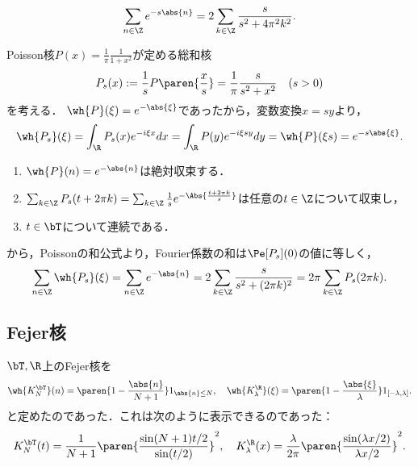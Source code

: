 \documentclass[uplatex,dvipdfmx]{jsreport}
\begin{document}
\begin{corollary}[$\R$上のPoisson核に関するPoissonの和公式]
    \[\sum_{n\in\Z}e^{-s\abs{n}}=2\sum_{k\in\Z}\frac{s}{s^2+4\pi^2k^2}.\]
\end{corollary}
\begin{Proof}
    Poisson核$P(x)=\frac{1}{\pi}\frac{1}{1+x^2}$が定める総和核
    \[P_s(x):=\frac{1}{s}P\paren{\frac{x}{s}}=\frac{1}{\pi}\frac{s}{s^2+x^2}\quad(s>0)\]
    を考える．
    $\wh{P}(\xi)=e^{-\abs{\xi}}$であったから，変数変換$x=sy$より，
    \[\wh{P_s}(\xi)=\int_\R P_s(x)e^{-i\xi x}dx=\int_\R P(y)e^{-i\xi sy}dy=\wh{P}(\xi s)=e^{-s\abs{\xi}}.\]
    \begin{enumerate}
        \item $\wh{P}(n)=e^{-\abs{n}}$は絶対収束する．
        \item $\sum_{k\in\Z}P_s(t+2\pi k)=\sum_{k\in\Z}\frac{1}{s}e^{-\Abs{\frac{t+2\pi k}{s}}}$は任意の$t\in\Z$について収束し，
        \item $t\in\bT$について連続である．
    \end{enumerate}
    から，Poissonの和公式より，Fourier係数の和は$\Pe[P_s](0)$の値に等しく，
    \[\sum_{n\in\Z}\wh{P_s}(\xi)=\sum_{n\in\Z}e^{-\abs{n}}=2\sum_{k\in\Z}\frac{s}{s^2+(2\pi k)^2}=2\pi\sum_{k\in\Z}P_s(2\pi k).\]
\end{Proof}

\subsection{Fejer核}

\begin{notation}
    $\bT,\R$上のFejer核を
    \[\wh{K_N^\bT}(n)=\paren{1-\frac{\abs{n}}{N+1}}1_{\abs{n}\le N},\quad\wh{K_\lambda^\R}(\xi)=\paren{1-\frac{\abs{\xi}}{\lambda}}1_{[-\lambda,\lambda]}.\]
    と定めたのであった．これは次のように表示できるのであった：
    \[K_N^\bT(t)=\frac{1}{N+1}\paren{\frac{\sin(N+1)t/2}{\sin(t/2)}}^2,\quad K_\lambda^\R(x)=\frac{\lambda}{2\pi}\paren{\frac{\sin(\lambda x/2)}{\lambda x/2}}^2.\]
\end{notation}
\end{document}
